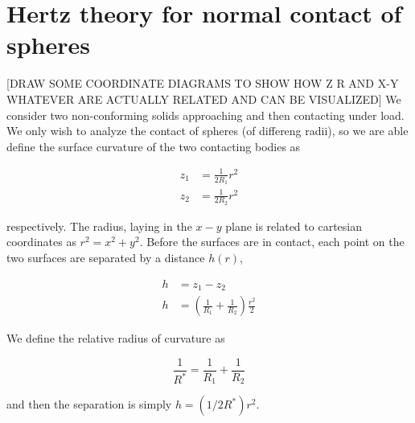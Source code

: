 \section{Hertz theory for normal contact of spheres}\label{sec:hertz-contact}
[DRAW SOME COORDINATE DIAGRAMS TO SHOW HOW Z R AND X-Y WHATEVER ARE ACTUALLY RELATED AND CAN BE VISUALIZED]
We consider two non-conforming solids approaching and then contacting under load. We only wish to analyze the contact of spheres (of differeng radii), so we are able define the surface curvature of the two contacting bodies as

\begin{align}
z_1 &= \frac{1}{2R_1}r^2 \\
z_2 &= \frac{1}{2R_2}r^2
\end{align}

respectively. The radius, laying in the $x-y$ plane is related to cartesian coordinates as $r^2 = x^2 + y^2$. Before the surfaces are in contact, each point on the two surfaces are separated by a distance $h(r)$,

\begin{align}\label{eq:separationh}
h &= z_1 - z_2 \nonumber \\
h & = \left(\frac{1}{R_1} + \frac{1}{R_2}\right)\frac{r^2}{2} 
\end{align}

We define the relative radius of curvature as

\begin{equation}\label{eq:relativeRadius}
\frac{1}{R^*} = \frac{1}{R_1} + \frac{1}{R_2}
\end{equation}

and then the separation is simply $h = (1/2R^*)r^2$.

